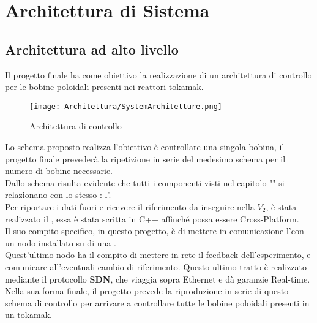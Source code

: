 \chapter{Architettura di Sistema}\label{systemDesign}



\section{Architettura ad alto livello}
Il progetto finale ha come obiettivo la realizzazione di un architettura di controllo per le bobine poloidali presenti nei reattori tokamak.

\begin{figure}[h]
	\centering
	\texttt{[image: Architettura/SystemArchitetture.png]}
	\caption[Schema finale dell'archiettettura di controllo]{Architettura di controllo}
\end{figure}

\noindent
Lo schema proposto realizza l'obiettivo è controllare una singola bobina, il progetto finale prevederà la ripetizione in serie del medesimo schema per il numero di bobine necessarie.\\

Dallo schema risulta evidente che tutti i componenti visti nel capitolo "" si relazionano con lo stesso \microControllore: l'\ArduinoUno.\\
Per riportare i dati fuori e ricevere il riferimento da inseguire nella $V_2$, è stata realizzato il , essa è stata scritta in C++ affinché possa essere Cross-Platform.\\
Il suo compito specifico, in questo progetto, è di mettere in comunicazione l'\ArduinoUno con un nodo \MARTe installato su di una \Rasp.\\
Quest'ultimo nodo ha il compito di mettere in rete il feedback dell'esperimento, e comunicare all'\ArduinoUno eventuali cambio di riferimento. Questo ultimo tratto è realizzato mediante il protocollo \textbf{SDN}, che viaggia sopra Ethernet e dà garanzie Real-time.\\
Nella sua forma finale, il progetto prevede la riproduzione in serie di questo schema di controllo per arrivare a controllare tutte le bobine poloidali presenti in un tokamak.

